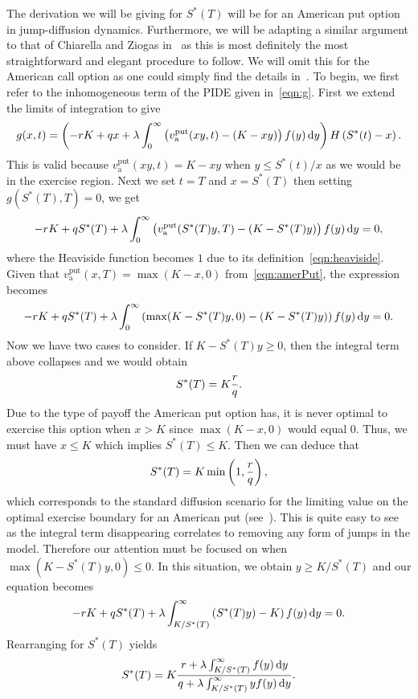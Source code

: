         	The derivation we will be giving for $S^*(T)$ will be for an American put option in jump-diffusion dynamics. Furthermore, we will be adapting a similar argument to that of Chiarella and Ziogas in~\cite{Chiarella2006} as this is most definitely the most straightforward and elegant procedure to follow. We will omit this for the American call option as one could simply find the details in~\cite{Chiarella2006}. To begin, we first refer to the inhomogeneous term of the PIDE given in~\eqref{eqn:g}. First we extend the limits of integration to give
        	$$
        		g(x,t) = \left(-rK + qx + \lambda\int_0^\infty \left( v_{\text{a}}^{\text{put}}(xy,t) - (K-xy)\right) f(y) \, \mathrm d y\right) H\left(S^*(t) - x\right).
        	$$
This is valid because $v_{\text{a}}^{\text{put}}(xy,t) = K - xy$ when $y \leq S^*(t)/x$ as we would be in the exercise region. Next we set $t = T$ and $x = S^*(T)$ then setting $g(S^*(T),T) = 0$, we get
        	$$
        		-rK + qS^*(T) + \lambda\int_0^\infty \left( v_{\text{a}}^{\text{put}}(S^*(T)y,T) - (K - S^*(T)y)\right) f(y) \, \mathrm d y = 0,
        	$$
where the Heaviside function becomes $1$ due to its definition~\eqref{eqn:heaviside}. Given that $v_{\text{a}}^{\text{put}}(x,T) = \max(K-x,0)$ from~\eqref{eqn:amerPut}, the expression becomes
		$$
			-rK + qS^*(T) + \lambda\int_0^\infty \left( \max(K-S^*(T)y,0) - (K - S^*(T)y)\right) f(y) \, \mathrm d y = 0.
		$$
Now we have two cases to consider. If $K-S^*(T)y \geq 0$, then the integral term above collapses and we would obtain
		$$
			S^*(T) = K\frac{r}{q}.
		$$
Due to the type of payoff the American put option has, it is never optimal to exercise this option when $x > K$ since $\max(K-x,0)$ would equal 0. Thus, we must have $x \leq K$ which implies $S^*(T) \leq K$. Then we can deduce that
	\begin{equation}
		\label{eqn:freePutTSD}
		S^*(T) = K\min\left( 1, \frac{r}{q} \right),
	\end{equation}
which corresponds to the standard diffusion scenario for the limiting value on the optimal exercise boundary for an American put (see~\cite[pp. 261]{Kwok2008}). This is quite easy to see as the integral term disappearing correlates to removing any form of jumps in the model. Therefore our attention must be focused on when $\max(K-S^*(T)y,0) \leq 0$. In this situation, we obtain $y \geq K/S^*(T)$ and our equation becomes
	$$
		-rK + qS^*(T) + \lambda\int_{K/S^*(T)}^\infty \left(S^*(T)y) - K \right)f(y) \, \mathrm d y = 0.
	$$
Rearranging for $S^*(T)$ yields
	$$
		S^*(T) = K\frac{r + \lambda\int_{K/S^*(T)}^\infty f(y) \, \mathrm d y}{q + \lambda\int_{K/S^*(T)}^\infty yf(y) \, \mathrm d y}.
	$$
